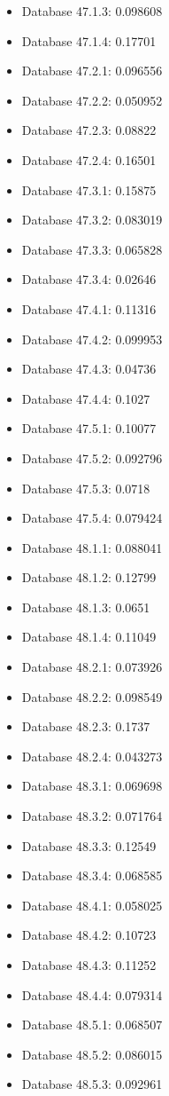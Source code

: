 \begin{itemize}
\item Database 47.1.3: 0.098608
\item Database 47.1.4: 0.17701
\item Database 47.2.1: 0.096556
\item Database 47.2.2: 0.050952
\item Database 47.2.3: 0.08822
\item Database 47.2.4: 0.16501
\item Database 47.3.1: 0.15875
\item Database 47.3.2: 0.083019
\item Database 47.3.3: 0.065828
\item Database 47.3.4: 0.02646
\item Database 47.4.1: 0.11316
\item Database 47.4.2: 0.099953
\item Database 47.4.3: 0.04736
\item Database 47.4.4: 0.1027
\item Database 47.5.1: 0.10077
\item Database 47.5.2: 0.092796
\item Database 47.5.3: 0.0718
\item Database 47.5.4: 0.079424
\item Database 48.1.1: 0.088041
\item Database 48.1.2: 0.12799
\item Database 48.1.3: 0.0651
\item Database 48.1.4: 0.11049
\item Database 48.2.1: 0.073926
\item Database 48.2.2: 0.098549
\item Database 48.2.3: 0.1737
\item Database 48.2.4: 0.043273
\item Database 48.3.1: 0.069698
\item Database 48.3.2: 0.071764
\item Database 48.3.3: 0.12549
\item Database 48.3.4: 0.068585
\item Database 48.4.1: 0.058025
\item Database 48.4.2: 0.10723
\item Database 48.4.3: 0.11252
\item Database 48.4.4: 0.079314
\item Database 48.5.1: 0.068507
\item Database 48.5.2: 0.086015
\item Database 48.5.3: 0.092961

\end{itemize}
